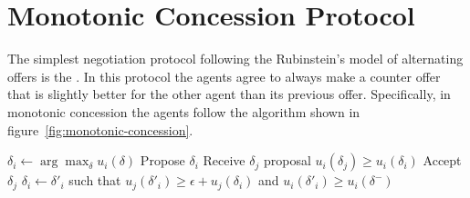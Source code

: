 \section{Monotonic Concession Protocol}

The simplest negotiation protocol following the Rubinstein's model of
alternating offers is the . In this
protocol the agents agree to always make a counter offer that is
slightly better for the other agent than its previous offer.
Specifically, in monotonic concession the agents follow the algorithm
shown in figure~\ref{fig:monotonic-concession}.

\begin{SCfigure}
  \begin{minipage}{1.0\linewidth}
\begin{codebox}
  \li $\delta_i \gets \arg \max_\delta u_i(\delta)$
  \li Propose $\delta_i$
  \li Receive $\delta_j$ proposal
  \li \If $u_i(\delta_j) \geq u_i(\delta_i)$ 
  \li \Then Accept $\delta_j$
  \li \Else $\delta_i \gets \delta'_i$ such that $u_j(\delta'_i)
	  \geq \epsilon + u_j(\delta_i)$ and $u_i(\delta'_i) \geq u_i(\delta^-)$ 
  \End 
  \li {}
\end{codebox}
  \end{minipage}
\caption{The monotonic concession protocol.}
  \label{fig:monotonic-concession}
\end{SCfigure}

